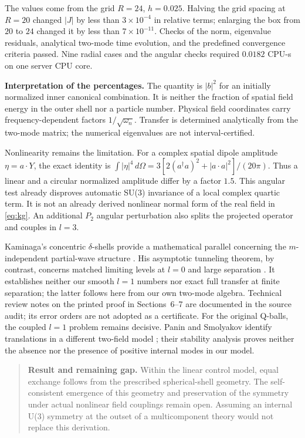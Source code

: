 \documentclass[a4paper,11pt]{article}
\begin{document}
The values come from the grid $R=24$, $h=0.025$. Halving the grid spacing at $R=20$ changed $|J|$ by less than $3\times10^{-4}$ in relative terms; enlarging the box from $20$ to $24$ changed it by less than $7\times10^{-11}$. Checks of the norm, eigenvalue residuals, analytical two-mode time evolution, and the predefined convergence criteria passed. Nine radial cases and the angular checks required $0.0182$ CPU-s on one server CPU core.

\textbf{Interpretation of the percentages.} The quantity is $|b|^2$ for an initially normalized inner canonical combination. It is neither the fraction of spatial field energy in the outer shell nor a particle number. Physical field coordinates carry frequency-dependent factors $1/\sqrt{\omega_n}$. Transfer is determined analytically from the two-mode matrix; the numerical eigenvalues are not interval-certified.

Nonlinearity remains the limitation. For a complex spatial dipole amplitude $\eta=a\cdot Y$, the exact identity is $\int|\eta|^4\,d\Omega=3[2(a^\dagger a)^2+|a\cdot a|^2]/(20\pi)$. Thus a linear and a circular normalized amplitude differ by a factor $1.5$. This angular test already disproves automatic SU(3) invariance of a local complex quartic term. It is not an already derived nonlinear normal form of the real field in \eqref{eq:kg}. An additional $P_2$ angular perturbation also splits the projected operator and couples in $l=3$.

Kaminaga's concentric $\delta$-shells provide a mathematical parallel concerning the $m$-independent partial-wave structure \cite[Lemma 9 and Remark 4]{Kaminaga}. His asymptotic tunneling theorem, by contrast, concerns matched limiting levels at $l=0$ and large separation \cite[Theorem 17]{Kaminaga}. It establishes neither our smooth $l=1$ numbers nor exact full transfer at finite separation; the latter follows here from our own two-mode algebra. Technical review notes on the printed proof in Sections~6--7 are documented in the source audit; its error orders are not adopted as a certificate. For the original Q-balls, the coupled $l=1$ problem remains decisive. Panin and Smolyakov identify translations in a different two-field model \cite[Eq.~(22)]{Panin}; their stability analysis proves neither the absence nor the presence of positive internal modes in our model.

\begin{quote}\textbf{Result and remaining gap.}
Within the linear control model, equal exchange follows from the prescribed spherical-shell geometry. The self-consistent emergence of this geometry and preservation of the symmetry under actual nonlinear field couplings remain open. Assuming an internal U(3) symmetry at the outset of a multicomponent theory would not replace this derivation.
\end{quote}
\end{document}
